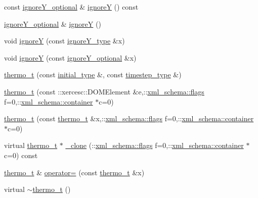 \begin{DoxyCompactItemize}
\item 
const \hyperlink{classthermo__t_a95e0efa769cf6e41e4851c821fde82a9}{ignore\+Y\+\_\+optional} \& \hyperlink{classthermo__t_aefb4116e31e4dd7586b915cd68dcd4c0}{ignoreY} () const 
\item 
\hyperlink{classthermo__t_a95e0efa769cf6e41e4851c821fde82a9}{ignore\+Y\+\_\+optional} \& \hyperlink{classthermo__t_ae6ae1b900ac23e51131d1243f177c825}{ignoreY} ()
\item 
void \hyperlink{classthermo__t_a32ec95928025c06fa81693a9d2c3672a}{ignoreY} (const \hyperlink{classthermo__t_a20faf1f752e18e7d9e8f2f7b943fbf01}{ignore\+Y\+\_\+type} \&x)
\item 
void \hyperlink{classthermo__t_a8fc0c14a4f1f52341cefe7518fb10ed0}{ignoreY} (const \hyperlink{classthermo__t_a95e0efa769cf6e41e4851c821fde82a9}{ignore\+Y\+\_\+optional} \&x)
\item 
\hyperlink{classthermo__t_af1527d191e02d46a08f146feb12fcf74}{thermo\+\_\+t} (const \hyperlink{classthermo__t_a3b889c80ce97870a6967ebee963438ed}{initial\+\_\+type} \&, const \hyperlink{classthermo__t_a6895e9b201424e2fada14df933774b0c}{timestep\+\_\+type} \&)
\item 
\hyperlink{classthermo__t_a9d2453469c50d26154ad9126e93da768}{thermo\+\_\+t} (const \+::xercesc\+::\+D\+O\+M\+Element \&e,\+::\hyperlink{namespacexml__schema_a0612287d030cb2732d31a45b258fdc87}{xml\+\_\+schema\+::flags} f=0,\+::\hyperlink{namespacexml__schema_ada9aa30dc722e93ee2ed7243085402a5}{xml\+\_\+schema\+::container} $\ast$c=0)
\item 
\hyperlink{classthermo__t_a524ba6dfc3781a5ee2a86e674097ff00}{thermo\+\_\+t} (const \hyperlink{classthermo__t}{thermo\+\_\+t} \&x,\+::\hyperlink{namespacexml__schema_a0612287d030cb2732d31a45b258fdc87}{xml\+\_\+schema\+::flags} f=0,\+::\hyperlink{namespacexml__schema_ada9aa30dc722e93ee2ed7243085402a5}{xml\+\_\+schema\+::container} $\ast$c=0)
\item 
virtual \hyperlink{classthermo__t}{thermo\+\_\+t} $\ast$ \hyperlink{classthermo__t_a879a6032b26ce6be5227b0f9841401c2}{\+\_\+clone} (\+::\hyperlink{namespacexml__schema_a0612287d030cb2732d31a45b258fdc87}{xml\+\_\+schema\+::flags} f=0,\+::\hyperlink{namespacexml__schema_ada9aa30dc722e93ee2ed7243085402a5}{xml\+\_\+schema\+::container} $\ast$c=0) const 
\item 
\hyperlink{classthermo__t}{thermo\+\_\+t} \& \hyperlink{classthermo__t_af17439150b657be91fdece5590d29877}{operator=} (const \hyperlink{classthermo__t}{thermo\+\_\+t} \&x)
\item 
virtual \hyperlink{classthermo__t_af1f580af388c6d697df6fe432928e7c3}{$\sim$thermo\+\_\+t} ()
\end{DoxyCompactItemize}

